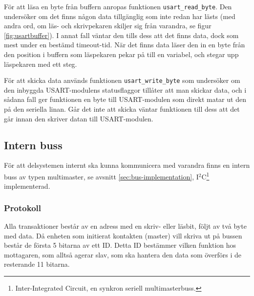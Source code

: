 
För att läsa en byte från buffern anropas funktionen \verb|usart_read_byte|. Den undersöker om det finns någon data tillgänglig som inte redan har lästs (med andra ord, om läs- och skrivpekaren skiljer sig från varandra, se figur \ref{fig:usartbuffer}). I annat fall väntar den tills dess att det finns data, dock som mest under en bestämd timeout-tid. När det finns data läser den in en byte från den position i buffern som läspekaren pekar på till en variabel, och stegar upp läspekaren med ett steg.

För att skicka data används funktionen \verb|usart_write_byte| som undersöker om den inbyggda USART-modulens statusflaggor tillåter att man skickar data, och i sådana fall ger funktionen en byte till USART-modulen som direkt matar ut den på den seriella linan. Går det inte att skicka väntar funktionen till dess att det går innan den skriver datan till USART-modulen.

\subsection{Intern buss}
\label{sec:bus}

För att delsystemen internt ska kunna kommunicera med varandra finns en intern buss av typen multimaster, se avsnitt \ref{sec:bus-implementation}, I$^2$C\footnote{Inter-Integrated Circuit, en synkron seriell multimasterbuss.} implementerad.

\subsubsection{Protokoll}
\label{sec:bus-protokoll}
Alla transaktioner består av en adress med en skriv- eller läsbit, följt av två byte med data. Då enheten som initierat kontakten (master) vill skriva ut på bussen består de första 5 bitarna av ett ID. Detta ID bestämmer vilken funktion hos mottagaren, som alltså agerar slav, som ska hantera den data som överförs i de resterande 11 bitarna.


